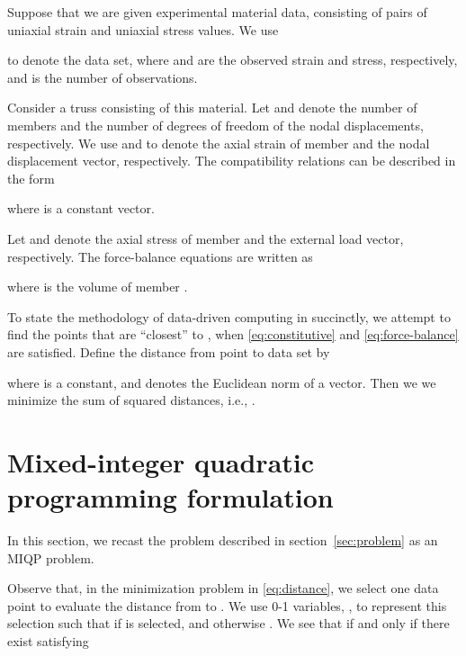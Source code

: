 \documentclass[a4paper,11pt]{scrartcl}
\theoremstyle{plain}
\theoremstyle{definition}
\theoremstyle{remark}
\begin{document}
Suppose that we are given experimental material data, consisting of 
pairs of uniaxial strain and uniaxial stress values. 
We use 
 
to denote the data set, 
where  and  are the 
observed strain and stress, respectively, 
and  is the number of observations. 

Consider a truss consisting of this material. 
Let  and  denote the number of members and the number of degrees 
of freedom of the nodal displacements, respectively. 
We use  and  to denote 
the axial strain of member  and the nodal displacement vector, respectively. 
The compatibility relations can be described in the form 

where  is a constant vector. 

Let  and  denote the axial 
stress of member  and the external load vector, respectively. 
The force-balance equations are written as 

where  is the volume of member . 

To state the methodology of data-driven computing in \cite{KO16} 
succinctly, we attempt to find the points 
 that 
are ``closest'' to , when \eqref{eq:constitutive} and 
\eqref{eq:force-balance} are satisfied. 
Define the distance from point  to 
data set  by 

where  is a constant, and 
 denotes the Euclidean norm of a vector. 
Then we we minimize the sum of squared distances, i.e., 
. 

























\section{Mixed-integer quadratic programming formulation}
\label{sec:mixed}

In this section, we recast the problem described in 
section~\ref{sec:problem} as an MIQP problem. 

Observe that, in the minimization problem in \eqref{eq:distance}, 
we select one data point to evaluate the distance from 
 to . 
We use 0-1 variables, , to represent this selection 
such that  if 
 is selected, and 
otherwise . 
We see that  if and only if there exist 
 satisfying 
\end{document}
